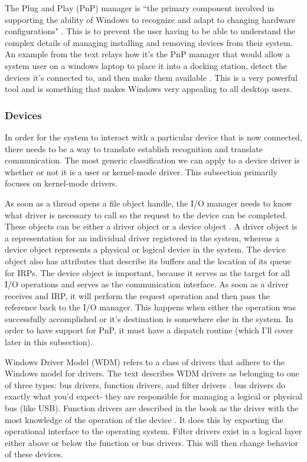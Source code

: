 \documentclass[10pt,draftclsnofoot,onecolumn]{IEEEtran}
\begin{document}
\par The Plug and Play (PnP) manager is ``the primary component involved in supporting the ability of Windows to recognize and adapt to changing hardware configurations" \cite{win:2}.
This is to prevent the user having to be able to understand the complex details of managing installing and removing devices from their system.
An example from the text relays how it's the PnP manager that would allow a system user on a windows laptop to place it into a docking station, detect the devices it's connected to, and then make them available \cite{win:2}.
This is a very powerful tool and is something that makes Windows very appealing to all desktop users.\\

\subsubsection{Devices}
\label{sub:Devices Windows}
\par In order for the system to interact with a particular device that is now connected, there needs to be a way to translate establish recognition and translate communication.
The most generic classification we can apply to a device driver is whether or not it is a user or kernel-mode driver.
This subsection primarily focuses on kernel-mode drivers.

\par As soon as a thread opens a file object handle, the I/O manager needs to know what driver is necessary to call so the request to the device can be completed.
These objects can be either a driver object or a device object \cite{win:2}.
A driver object is a representation for an individual driver registered in the system, whereas a device object represents a physical or logical device in the system.
The device object also has attributes that describe its buffers and the location of its queue for IRPs.
The device object is important, because it serves as the target for all I/O operations and serves as the communication interface.
As soon as a driver receives and IRP, it will perform the request operation and then pass the reference back to the I/O manager.
This happens when either the operation was successfully accomplished or it's destination is somewhere else in the system.
In order to have support for PnP, it must have a dispatch routine (which I'll cover later in this subsection).

\par Windows Driver Model (WDM) refers to a class of drivers that adhere to the Windows model for drivers.
The text describes WDM drivers as belonging to one of three types: bus drivers, function drivers, and filter drivers \cite{win:2}.
bus drivers do exactly what you'd expect- they are responsible for managing a logical or physical bus (like USB).
Function drivers are described in the book as the driver with the most knowledge of the operation of the device \cite{win:2}.
It does this by exporting the operational interface to the operating system.
Filter drivers exist in a logical layer either above or below the function or bus drivers.
This will then change behavior of these devices.
\end{document}
